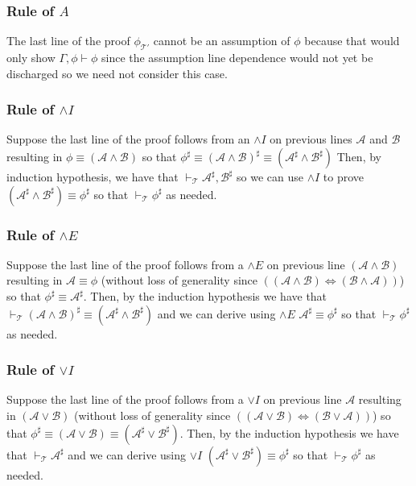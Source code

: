 \documentclass[12pt]{article}
\newcommand{\bv}[1]{\boldsymbol{#1}}
\newcommand{\mc}[1]{\mathcal{#1}}
\newcommand{\bc}[1]{\bv{\mc{#1}}}
\begin{document}
\hrulefill
\subsubsection{Rule of $A$}
The last line of the proof $\phi_{\bc{T}'}$ cannot be an assumption of $\phi$ because that would only show $\Gamma,\phi \vdash \phi$ since the assumption line dependence would not yet be discharged so we need not consider this case.

\hrulefill

\subsubsection*{Rule of $\land I$}
Suppose the last line of the proof follows from an $\land I$ on previous lines $\mc{A}$ and $\mc{B}$ resulting in $\phi \equiv (\mc{A} \land \mc{B})$ so that $\phi^{\sharp} \equiv (\mc{A} \land \mc{B})^{\sharp} \equiv (\mc{A}^{\sharp}\land \mc{B}^{\sharp})$ Then, by induction hypothesis, we have that $\vdash_{\bc{T}} \mc{A}^{\sharp}, \mc{B}^{\sharp}$ so we can use $\land I$ to prove $(\mc{A}^{\sharp} \land \mc{B}^{\sharp}) \equiv \phi^{\sharp}$ so that $\vdash_{\bc{T}} \phi^{\sharp}$ as needed.

\hrulefill

\subsubsection*{Rule of $\land E$}
Suppose the last line of the proof follows from a $\land E$ on previous line $(\mc{A} \land \mc{B})$ resulting in $\mc{A}\equiv\phi$ (without loss of generality since $((\mc{A} \land \mc{B}) \iff (\mc{B} \land \mc{A}))$) so that $\phi^{\sharp} \equiv \mc{A}^{\sharp}$. Then, by the induction hypothesis we have that $\vdash_{\bc{T}}(\mc{A}\land\mc{B})^{\sharp}\equiv (\mc{A}^{\sharp} \land \mc{B}^{\sharp})$ and we can derive using $\land E$ $\mc{A}^{\sharp} \equiv \phi^{\sharp}$ so that $\vdash_{\bc{T}} \phi^{\sharp}$ as needed.

\hrulefill

\subsubsection*{Rule of $\lor I$}
Suppose the last line of the proof follows from a $\lor I$ on previous line $\mc{A}$ resulting in $(\mc{A} \lor \mc{B})$ (without loss of generality since $((\mc{A}\lor \mc{B})\iff(\mc{B} \lor \mc{A}))$) so that $\phi^{\sharp} \equiv (\mc{A} \lor \mc{B}) \equiv (\mc{A}^{\sharp} \lor \mc{B}^{\sharp})$. Then, by the induction hypothesis we have that $\vdash_{\bc{T}}\mc{A}^{\sharp}$ and we can derive using $\lor I$ $(\mc{A}^{\sharp} \lor \mc{B}^{\sharp}) \equiv \phi^{\sharp}$ so that $\vdash_{\bc{T}}\phi^{\sharp}$ as needed.
\end{document}
